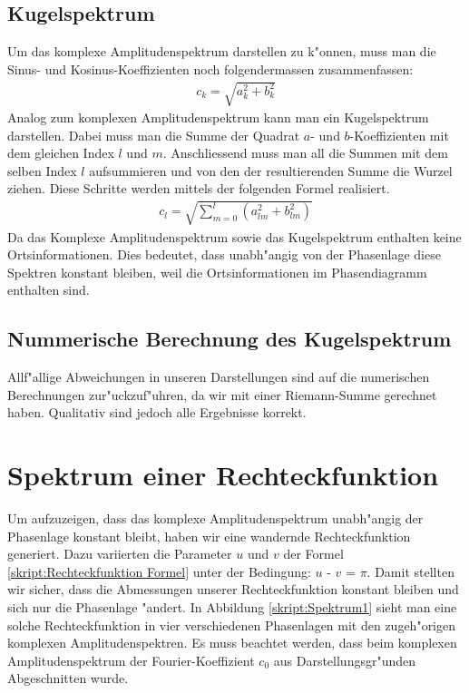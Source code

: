 \begin{refsection}
\subsection{Kugelspektrum}
Um das komplexe Amplitudenspektrum darstellen zu k"onnen, muss man die
Sinus- und Kosinus-Koeffizienten noch folgendermassen zusammenfassen:
\begin{align*}
c_k= \sqrt{a^2_{k}+b^2_{k}}
\end{align*}
Analog zum komplexen Amplitudenspektrum kann man ein Kugelspektrum 
darstellen. 
Dabei muss man die Summe der Quadrat $a$- und $b$-Koeffizienten mit 
dem gleichen Index $l$ und $m$. Anschliessend muss man all die Summen
mit dem selben Index $l$ aufsummieren und von den der resultierenden 
Summe die Wurzel ziehen. Diese Schritte werden mittels der folgenden 
Formel realisiert. 
\begin{align*}
c_l= \sqrt{\sum_{m=0}^l (a^2_{lm}+b^2_{lm})}
\end{align*}
Da das Komplexe Amplitudenspektrum sowie das Kugelspektrum enthalten 
keine Ortsinformationen. Dies bedeutet, dass unabh"angig  von der
Phasenlage diese Spektren konstant bleiben, weil die Ortsinformationen
im Phasendiagramm enthalten sind.

\subsection{Nummerische Berechnung des Kugelspektrum}
Allf"allige Abweichungen in unseren Darstellungen sind auf die 
numerischen Berechnungen zur"uckzuf"uhren, da wir mit einer 
Riemann-Summe gerechnet haben.
Qualitativ sind jedoch alle Ergebnisse korrekt. 

\section{Spektrum einer Rechteckfunktion}
Um aufzuzeigen, dass das komplexe Amplitudenspektrum unabh"angig der 
Phasenlage konstant bleibt, haben wir eine wandernde Rechteckfunktion 
generiert. 
Dazu variierten die Parameter $u$ und $v$ der Formel 
\ref{skript:Rechteckfunktion Formel}
unter der Bedingung: $u$ - $v$ = $\pi$.
Damit stellten wir sicher, dass die Abmessungen unserer 
Rechteckfunktion konstant bleiben und sich nur die Phasenlage "andert.
In Abbildung \ref{skript:Spektrum1} sieht man eine solche 
Rechteckfunktion in vier verschiedenen Phasenlagen mit den zugeh"origen 
komplexen Amplitudenspektren. 
Es muss beachtet werden, dass beim komplexen Amplitudenspektrum der 
Fourier-Koeffizient $c_0$ aus Darstellungsgr"unden Abgeschnitten wurde.


\end{refsection}
